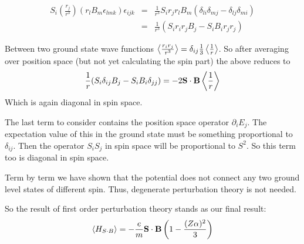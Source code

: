 \begin{eqnarray*}
S_i \left( \frac{r_j}{r^3} \right) (r_l B_m \epsilon_{lmk}) \epsilon_{ijk}
	&=&	\frac{1}{r^3} S_i r_j r_l B_m (\delta_{li} \delta_{mj} - \delta_{lj} \delta_{mi} )	\\
	&=&	\frac{1}{r^3} (S_i r_i r_j B_j - S_i B_i r_j r_j)
\end{eqnarray*}	

Between two ground state wave functions $\left< \frac{r_i r_j}{r^3} \right>=\delta_{ij}\frac{1}{3}\left< \frac{1}{r} \right>$.  So after averaging over position space (but not yet calculating the spin part) the above reduces to
\[	 
	\frac{1}{r} (S_i \delta_{ij} B_j - S_i B_i \delta_{jj})
	= -2 \mathbf{S} \cdot \mathbf{B} \left< \frac{1}{r} \right>
\]
Which is again diagonal in spin space.

The last term to consider contains the position space operator $\partial_i E_j$.  The expectation value of this in the ground state must be something proportional to $\delta_{ij}$.  Then the operator $S_i S_j$ in spin space will be proportional to $S^2$.  So this term too is diagonal in spin space.

Term by term we have shown that the potential does not connect any two ground level states of different spin.  Thus, degenerate perturbation theory is not needed.

So the result of first order perturbation theory stands as our final result:
\[ \left< H_{S \cdot B}  \right>
	=  - \frac{e}{m} \mathbf{S} \cdot \mathbf{B} \left (1 - \frac{(Z\alpha)^2}{3} \right )			 
\]




